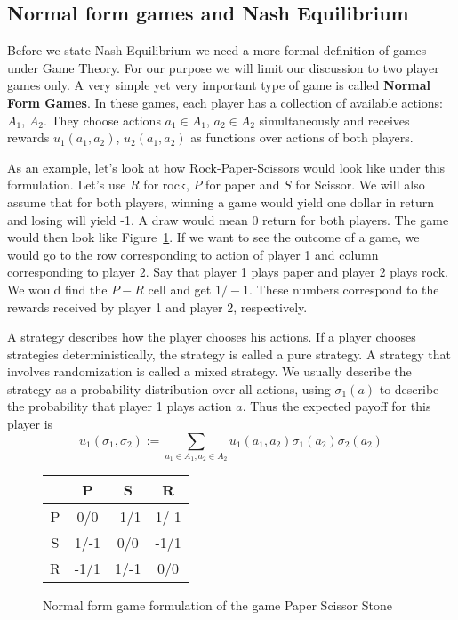 \documentclass[10pt,a4paper]{article}
\begin{document}
\subsection{Normal form games and Nash Equilibrium}
Before we state Nash Equilibrium we need a more formal definition of games under Game Theory. For our purpose we will limit our discussion to two player games only. A very simple yet very important type of game is called \textbf{Normal Form Games}. In these games, each player has a collection of available actions: $A_1$, $A_2$. They choose actions $a_1 \in A_1$, $a_2 \in A_2$ simultaneously and receives rewards $u_1(a_1, a_2)$, $u_2(a_1, a_2)$ as functions over actions of both players.

As an example, let's look at how Rock-Paper-Scissors would look like under this formulation. Let's use $R$ for rock, $P$ for paper and $S$ for Scissor. We will also assume that for both players, winning a game would yield one dollar in return and losing will yield -1. A draw would mean 0 return for both players. The game would then look like Figure~\ref{figure:RPS}. If we want to see the outcome of a game, we would go to the row corresponding to action of player 1 and column corresponding to player 2. Say that player 1 plays paper and player 2 plays rock. We would find the $P-R$ cell and get $1/-1$. These numbers correspond to the rewards received by player 1 and player 2, respectively.

A strategy describes how the player chooses his actions. If a player chooses strategies deterministically, the strategy is called a pure strategy. A strategy that involves randomization is called a mixed strategy. We usually describe the strategy as a probability distribution over all actions, using $\sigma_1(a)$ to describe the probability that player 1 plays action $a$. Thus the expected payoff for this player is
$$
	u_1(\sigma_1, \sigma_2) := \sum_{a_1 \in A_1, a_2 \in A_2} u_1(a_1, a_2)\sigma_1(a_2)\sigma_2(a_2)
$$

\begin{figure}[ht]
	\centering
	\begin{tabular}{|c|c|c|c|}
		\hline
		  & P    & S    & R    \\ \hline
		P & 0/0  & -1/1 & 1/-1 \\ \hline
		S & 1/-1 & 0/0  & -1/1 \\ \hline
		R & -1/1 & 1/-1 & 0/0  \\ \hline
	\end{tabular}
	\caption{Normal form game formulation of the game Paper Scissor Stone}
	\label{figure:RPS}
\end{figure}
\end{document}
